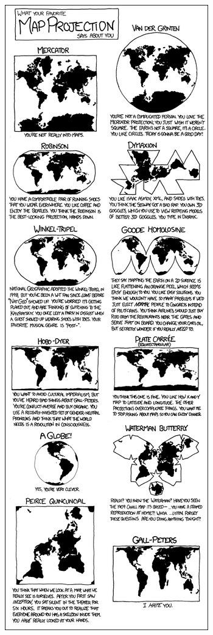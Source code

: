\documentclass[]{article}
\theoremstyle{definition}
\theoremstyle{definition}
\theoremstyle{definition}
\theoremstyle{remark}
\begin{document}
\begin{figure}
\centering
\includegraphics{media/map_projections.png}
\caption{}
\end{figure}
\end{document}

